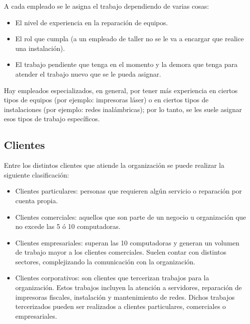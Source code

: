 \documentclass[12pt]{extarticle}
\begin{document}
\begin{spacing}{1.2}

    A cada empleado se le asigna el trabajo dependiendo de varias cosas:
    \begin{itemize}
        \item El nivel de experiencia en la reparación de equipos.
        \item El rol que cumpla (a un empleado de taller no se le va a encargar que realice una instalación).
        \item El trabajo pendiente que tenga en el momento y la demora que tenga para atender el trabajo nuevo que se le pueda asignar. 
    \end{itemize}

    Hay empleados especializados, en general, por tener más experiencia en ciertos tipos de equipos (por ejemplo: impresoras láser) o en ciertos tipos de instalaciones (por ejemplo: redes inalámbricas); por lo tanto, se les suele asignar esos tipos de trabajo específicos.

    \pagebreak
    \subsection{Clientes}

    Entre los distintos clientes que atiende la organización se puede realizar la siguiente clasificación:
    \begin{itemize}
        \item Clientes particulares: personas que requieren algún servicio o reparación por cuenta propia.
        \item Clientes comerciales: aquellos que son parte de un negocio u organización que no excede las 5 ó 10 computadoras.
        \item Clientes empresariales: superan las 10 computadoras y generan un volumen de trabajo mayor a los clientes comerciales. Suelen contar con distintos sectores, complejizando la comunicación con la organización.
        \item Clientes corporativos: son clientes que tercerizan trabajos para la organización. Estos trabajos incluyen la atención a servidores, reparación de impresoras fiscales, instalación y mantenimiento de redes. Dichos trabajos tercerizados pueden ser realizados a clientes particulares, comerciales o empresariales.
    \end{itemize}


\end{spacing}
\end{document}
